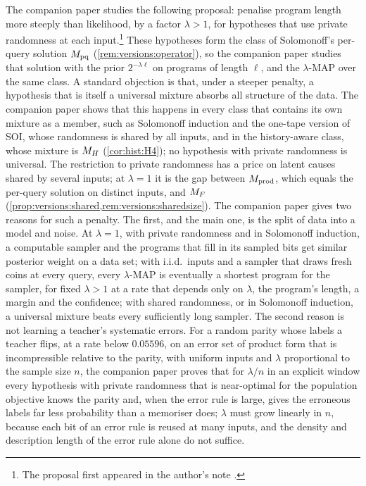 The companion paper \citep{claudeSFI2026steeper} studies the following proposal: penalise program length more steeply than likelihood, by a factor $\lambda>1$, for hypotheses that use private randomness at each input.\footnote{The proposal first appeared in the author's note \citep{hanni2026grokking}.} These hypotheses form the class of Solomonoff's per-query solution $M_{\mathrm{pq}}$ (\cref{rem:versions:operator}), so the companion paper studies that solution with the prior $2^{-\lambda\ell}$ on programs of length $\ell$, and the $\lambda$-MAP over the same class. A standard objection is that, under a steeper penalty, a hypothesis that is itself a universal mixture absorbs all structure of the data. The companion paper shows that this happens in every class that contains its own mixture as a member, such as Solomonoff induction and the one-tape version of SOI, whose randomness is shared by all inputs, and in the history-aware class, whose mixture is $M_{H}$ (\cref{cor:hist:H4}); no hypothesis with private randomness is universal. The restriction to private randomness has a price on latent causes shared by several inputs; at $\lambda=1$ it is the gap between $M_{\mathrm{prod}}$, which equals the per-query solution on distinct inputs, and $M_{F}$ (\cref{prop:versions:shared,rem:versions:sharedsize}). The companion paper gives two reasons for such a penalty. The first, and the main one, is the split of data into a model and noise. At $\lambda=1$, with private randomness and in Solomonoff induction, a computable sampler and the programs that fill in its sampled bits get similar posterior weight on a data set; with i.i.d.\ inputs and a sampler that draws fresh coins at every query, every $\lambda$-MAP is eventually a shortest program for the sampler, for fixed $\lambda>1$ at a rate that depends only on $\lambda$, the program's length, a margin and the confidence; with shared randomness, or in Solomonoff induction, a universal mixture beats every sufficiently long sampler. The second reason is not learning a teacher's systematic errors. For a random parity whose labels a teacher flips, at a rate below $0.05596$, on an error set of product form that is incompressible relative to the parity, with uniform inputs and $\lambda$ proportional to the sample size $n$, the companion paper proves that for $\lambda/n$ in an explicit window every hypothesis with private randomness that is near-optimal for the population objective knows the parity and, when the error rule is large, gives the erroneous labels far less probability than a memoriser does; $\lambda$ must grow linearly in $n$, because each bit of an error rule is reused at many inputs, and the density and description length of the error rule alone do not suffice.
